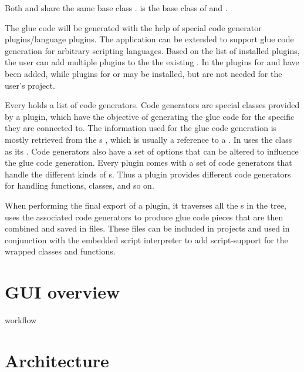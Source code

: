 Both  and  share the same base class .  is the base class of  and .

The glue code will be generated with the help of special code generator plugins/language plugins. The application can be extended to support glue code generation for arbitrary scripting languages. Based on the list of installed plugins, the user can add multiple plugins to the the existing . In  the plugins for  and  have been added, while plugins for  or  may be installed, but are not needed for the user's project.

Every  holds a list of code generators. Code generators are special classes provided by a plugin, which have the objective of generating the glue code for the specific  they are connected to. The information used for the glue code generation is mostly retrieved from the s , which is usually a reference to a . In   uses the  class  as its . Code generators also have a set of options that can be altered to influence the glue code generation.
Every plugin comes with a set of code generators that handle the different kinds of s. Thus a plugin provides different code generators for handling functions, classes, and so on. 

When performing the final export of a plugin, it traverses all the s in the tree, uses the associated code generators to produce glue code pieces that are then combined and saved in files. These files can be included in  projects and used in conjunction with the embedded script interpreter to add script-support for the wrapped classes and functions.

\section{GUI overview}

workflow 

\section{Architecture}

